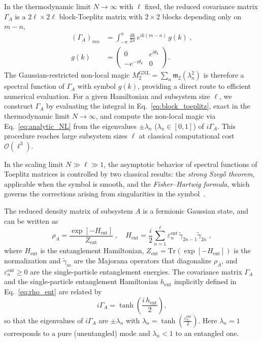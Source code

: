\documentclass[aps,prl,twocolumn,superscriptaddress,reprint,longbibliography,nofootinbib]{revtex4-2}
\begin{document}
In the thermodynamic limit $N\to\infty$ with $\ell$ fixed, the reduced covariance matrix $\Gamma_A$ is a $2\ell\times 2\ell$ block-Toeplitz matrix with $2\times 2$ blocks depending only on $m-n$,
\begin{equation}
\begin{split}
    (\Gamma_A)_{mn} &= \int_{-\pi}^{\pi}\frac{dk}{2\pi}\,e^{ik(m-n)}\,g(k)\;,
    \\
    g(k) &= \begin{pmatrix} 0 & e^{i\theta_k} \\ -e^{-i\theta_k} & 0 \end{pmatrix}.
\end{split}
\label{eq:block_toeplitz}
\end{equation}
The Gaussian-restricted non-local magic $M_2^{\mathrm{GNL}} = \sum_n \mathfrak{m}_2(\lambda_n^2)$ is therefore a spectral function of $\Gamma_A$ with symbol $g(k)$, providing a direct route to efficient numerical evaluation.
For a given Hamiltonian and subsystem size $\ell$, we construct $\Gamma_A$ by evaluating the integral in Eq.~\eqref{eq:block_toeplitz}, exact in the thermodynamic limit $N\to\infty$, and compute the non-local magic via Eq.~\eqref{eq:analytic_NL} from the eigenvalues $\pm\lambda_n$ ($\lambda_n\in[0,1]$) of $i\Gamma_A$.
This procedure reaches large subsystem sizes $\ell$ at classical computational cost $\mathcal{O}(\ell^3)$.

In the scaling limit $N\gg \ell\gg 1$, the asymptotic behavior of spectral functions of Toeplitz matrices is controlled by two classical results: the \emph{strong Szeg\H{o} theorem}, applicable when the symbol is smooth, and the \emph{Fisher--Hartwig formula}, which governs the corrections arising from singularities in the symbol~\cite{Jin_2004,Its_2005}.

The reduced density matrix of subsystem $A$ is a fermionic Gaussian state, and can be written as~\cite{Peschel2004}
\begin{equation}
    \rho_A = \frac{\exp[{-H_{\mathrm{ent}}}]}{Z_{\mathrm{ent}}}\;, \quad H_{\mathrm{ent}} = \frac{i}{2}\sum_{n=1}^{\ell} \varepsilon_n^{\mathrm{ent}}\,\tilde\gamma_{2n-1}\tilde\gamma_{2n}\;,
    \label{eq:rho_ent}
\end{equation}
where $H_{\mathrm{ent}}$ is the entanglement Hamiltonian, $Z_{\mathrm{ent}}=\mathrm{Tr}(\exp[{-H_{\mathrm{ent}}}])$ is the normalization and $\tilde\gamma_m$ are the Majorana operators that diagonalize $\rho_A$, and $\varepsilon_n^{\mathrm{ent}} \geq 0$ are the single-particle entanglement energies.
The covariance matrix $\Gamma_A$ and the single-particle entanglement Hamiltonian $h_{\mathrm{ent}}$ implicitly defined in Eq.~\eqref{eq:rho_ent} are related by
\begin{equation}
    i\Gamma_A = \tanh\!\left(\frac{i\,h_{\mathrm{ent}}}{2}\right),
    \label{eq:Gamma_tanh}
\end{equation}
so that the eigenvalues of $i\Gamma_A$ are $\pm\lambda_n$ with $\lambda_n = \tanh\!\left(\frac{\varepsilon_n^{\mathrm{ent}}}{2}\right)$. 
Here $\lambda_n = 1$ corresponds to a pure (unentangled) mode and $\lambda_n < 1$ to an entangled one.
\end{document}
